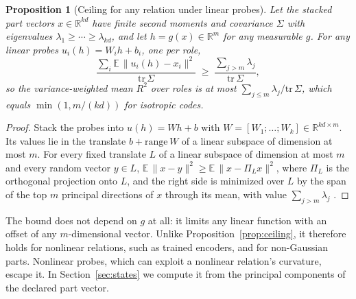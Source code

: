 \documentclass[10pt]{article}
\theoremstyle{plain}
\newtheorem{proposition}{Proposition}
\theoremstyle{remark}
\newcommand{\R}{\mathbb{R}}
\begin{document}
\begin{proposition}[Ceiling for any relation under linear probes]
\label{prop:ey}
Let the stacked part vectors $x \in \R^{kd}$ have finite second moments and covariance $\Sigma$ with eigenvalues $\lambda_1 \ge \cdots \ge \lambda_{kd}$, and let $h = g(x) \in \R^m$ for any measurable $g$. For any linear probes $u_i(h) = W_i h + b_i$, one per role,
\begin{equation}
  \frac{\sum_i \mathbb{E}\,\lVert u_i(h) - x_i \rVert^2}{\mathrm{tr}\,\Sigma} \;\ge\; \frac{\sum_{j > m} \lambda_j}{\mathrm{tr}\,\Sigma},
\end{equation}
so the variance-weighted mean $R^2$ over roles is at most $\sum_{j \le m} \lambda_j / \mathrm{tr}\,\Sigma$, which equals $\min(1, m/(kd))$ for isotropic codes.
\end{proposition}

\begin{proof}
Stack the probes into $u(h) = Wh + b$ with $W = [W_1; \ldots; W_k] \in \R^{kd \times m}$. Its values lie in the translate $b + \mathrm{range}\,W$ of a linear subspace of dimension at most $m$. For every fixed translate $L$ of a linear subspace of dimension at most $m$ and every random vector $y \in L$, $\mathbb{E}\,\lVert x - y \rVert^2 \ge \mathbb{E}\,\lVert x - \Pi_L x \rVert^2$, where $\Pi_L$ is the orthogonal projection onto $L$, and the right side is minimized over $L$ by the span of the top $m$ principal directions of $x$ through its mean, with value $\sum_{j > m} \lambda_j$ \citep{eckart1936}.
\end{proof}

\noindent
The bound does not depend on $g$ at all: it limits any linear function with an offset of any $m$-dimensional vector. Unlike Proposition~\ref{prop:ceiling}, it therefore holds for nonlinear relations, such as trained encoders, and for non-Gaussian parts. Nonlinear probes, which can exploit a nonlinear relation's curvature, escape it. In Section~\ref{sec:states} we compute it from the principal components of the declared part vector.
\end{document}
